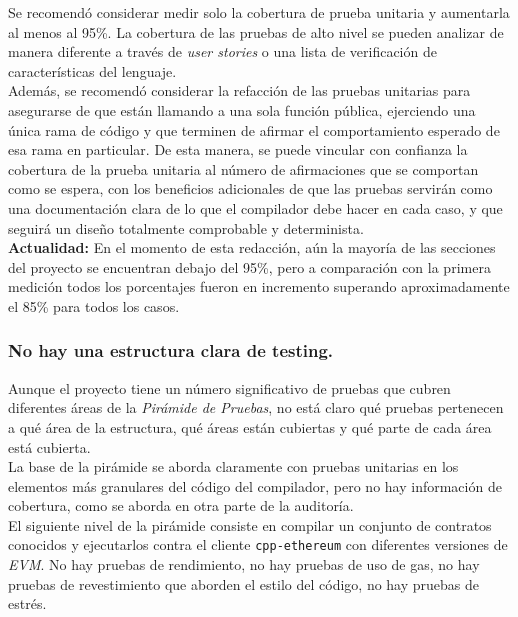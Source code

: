 Se recomendó considerar medir solo la cobertura de prueba unitaria y aumentarla al menos al 95\%. La cobertura de las pruebas de alto nivel se pueden analizar de manera diferente a través de \textit{user stories} o una lista de verificación de características del lenguaje.\\

Además, se recomendó considerar la refacción de las pruebas unitarias para asegurarse de que están llamando a una sola función pública, ejerciendo una única rama de código y que terminen de afirmar el comportamiento esperado de esa rama en particular. De esta manera, se puede vincular con confianza la cobertura de la prueba unitaria al número de afirmaciones que se comportan como se espera, con los beneficios adicionales de que las pruebas servirán como una documentación clara de lo que el compilador debe hacer en cada caso, y que seguirá un diseño totalmente comprobable y determinista.\\

\textbf{Actualidad:} En el momento de esta redacción, aún la mayoría de las secciones del proyecto se encuentran debajo del 95\%, pero a comparación con la primera medición todos los porcentajes fueron en incremento superando aproximadamente el 85\%\cite{CodeCovEthereumSolidityCurrent} para todos los casos.\\


\subsubsection{No hay una estructura clara de testing.}
Aunque el proyecto tiene un número significativo de pruebas que cubren diferentes áreas de la \textit{Pirámide de Pruebas}, no está claro qué pruebas pertenecen a qué área de la estructura, qué áreas están cubiertas y qué parte de cada área está cubierta.\\

La base de la pirámide se aborda claramente con pruebas unitarias en los elementos más granulares del código del compilador, pero no hay información de cobertura, como se aborda en otra parte de la auditoría.\\

El siguiente nivel de la pirámide consiste en compilar un conjunto de contratos conocidos y ejecutarlos contra el cliente \verb|cpp-ethereum| con diferentes versiones de \textit{EVM}.
No hay pruebas de rendimiento, no hay pruebas de uso de gas, no hay pruebas de revestimiento que aborden el estilo del código, no hay pruebas de estrés.\\

